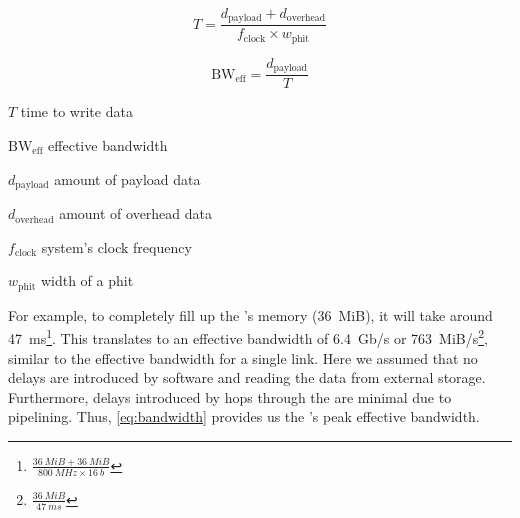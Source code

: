 \begin{equation} \label{eq:latency}
    T = 
    \frac{d_{\text{payload}} + d_{\text{overhead}}}
    {f_{\text{clock}} \times w_{\text{phit}}}
\end{equation}

\begin{equation} \label{eq:bandwidth}
    \text{BW}_{\text{eff}} =
    \frac{d_\text{payload}}{T}
\end{equation}

\begin{eqexpl}[15mm]
    \item{$T$} time to write data
    \item{$\text{BW}_{\text{eff}}$} effective bandwidth
    \item{$d_{\text{payload}}$} amount of payload data
    \item{$d_{\text{overhead}}$} amount of overhead data
    \item{$f_{\text{clock}}$} system's clock frequency
    \item{$w_{\text{phit}}$} width of a phit
\end{eqexpl}

For example, to completely fill up the \graicore{}'s memory (\SI{36}{MiB}), it will take around \SI{47}{ms}\footnote{$\frac{\SI{36}{MiB} + \SI{36}{MiB}}{\SI{800}{MHz} \times \SI{16}{b}}$}.
This translates to an effective bandwidth of \SI{6.4}{Gb/s} or \SI{763}{MiB/s}\footnote{$\frac{\SI{36}{MiB}}{\SI{47}{ms}}$}, similar to the effective bandwidth for a single link.
Here we assumed that no delays are introduced by software and reading the data from external storage.
Furthermore, delays introduced by hops through the \confignoc{} are minimal due to pipelining.
Thus, \cref{eq:bandwidth} provides us the \confignoc{}'s peak effective bandwidth.
